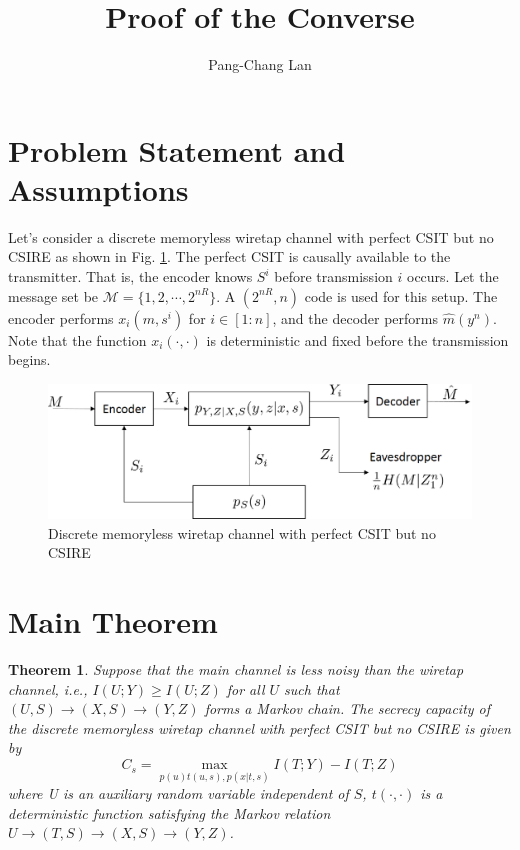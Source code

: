 \documentclass[12pt, Draft, onecolumn]{IEEEtran}
\def\ie{{\it i.e., }}
\def\calM{{\mathcal{M}}}
\newtheorem{theorem}{Theorem}
\begin{document}
\title{Proof of the Converse}
\author{Pang-Chang Lan}
\maketitle

\section{Problem Statement and Assumptions}
Let's consider a discrete memoryless wiretap channel with perfect CSIT but no CSIRE as shown in Fig. \ref{fig.secrecy_noCSIR_channel}. The perfect CSIT is causally available to the transmitter. That is, the encoder knows $S^i$ before transmission $i$ occurs. Let the message set be $\calM=\{1,2,\cdots,2^{nR}\}$. A $(2^{nR},n)$ code is used for this setup. The encoder performs $x_i(m,s^i)$ for $i\in [1:n]$, and the decoder performs $\hat{m}(y^n)$. Note that the function $x_i(\cdot, \cdot)$ is deterministic and fixed before the transmission begins.

\begin{figure}[h]
\centering
\includegraphics[scale=.6]{figs/secrecy_noCSIR_channel}
\caption{Discrete memoryless wiretap channel with perfect CSIT but no CSIRE}
\label{fig.secrecy_noCSIR_channel}
\end{figure}

\section{Main Theorem}
\begin{theorem}
Suppose that the main channel is less noisy than the wiretap channel, \ie $I(U;Y)\geq I(U;Z)$ for all $U$ such that $(U,S)\rightarrow (X,S)\rightarrow (Y,Z)$ forms a Markov chain. The secrecy capacity of the discrete memoryless wiretap channel with perfect CSIT but no CSIRE is given by
\begin{equation}
C_s = \max_{p(u)t(u,s),p(x|t,s)} I(T;Y)-I(T;Z)
\end{equation}
where U is an auxiliary random variable independent of $S$, $t(\cdot,\cdot)$ is a deterministic function satisfying the Markov relation $U\rightarrow (T,S)\rightarrow (X,S)\rightarrow (Y,Z)$.
\end{theorem}
\end{document}
